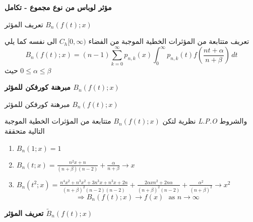 	\begin{frame}
	\begin{center}
		\Huge\textbf{مؤثر لوباس من نوع مجموع - تكامل}
	\end{center}
\end{frame}
	
	\begin{frame}{تعريف المؤثر $B_n(f(t); x)$}
		\begin{exampleblock}{تعريف}
			متتابعة من المؤثرات الخطية الموجبة من الفضاء $C_h[0, \infty)$ الى نفسه كما يلي
			\[
			B_n(f(t); x) = (n-1)\sum_{k=0}^{\infty} p_{n, k}(x) \int_{0}^{\infty} p_{n, k}(t) f\left(\frac{nt + \alpha}{n + \beta}\right) \, dt
			\]
			حيث $0 \leq \alpha\leq \beta$
		\end{exampleblock}
	\end{frame}
	
	\begin{frame}
		\begin{center}
			\Huge\textbf{مبرهنة كورفكن للمؤثر $B_n(f(t); x)$}
		\end{center}
	\end{frame}
	
	\begin{frame}{مبرهنة كورفكن للمؤثر $B_n(f(t); x)$}
		\begin{exampleblock}{نظرية}
			لتكن $B_n(f(t);x)$ متتابعة من المؤثرات الخطية الموجبة \textit{L.P.O} والشروط التالية متحققة 
			\begin{english}
				\begin{enumerate}
					\item $B_n(1; x) =1$
					\item $B_n(t; x) = \frac{n^2x + n}{(n+ \beta)(n-2)} + \frac{\alpha}{n + \beta} \to x$
					\item $B_n(t^2; x) = \frac{n^4x^2 + n^3x^2 + 3n^3x + n^3 x + 2n}{(n+\beta)^2 (n-2)(n-2)} + \frac{2\alpha x n^2 + 2n \alpha}{(n+\beta)^2 (n-2)} + \frac{\alpha^2 }{(n+\beta)^2} \to x^2$
					\[
					\Rightarrow B_n(f(t); x) \to f(x)\,\, \text{ as $n \to \infty$}
					\]
				\end{enumerate}
			\end{english}
		\end{exampleblock}
	\end{frame}
\newcommand{\tB}{\tilde{B}}	
\begin{frame}
	\begin{center}
		\Huge\textbf{تعريف المؤثر $\tB_n(f(t); x)$}
	\end{center}
\end{frame}

